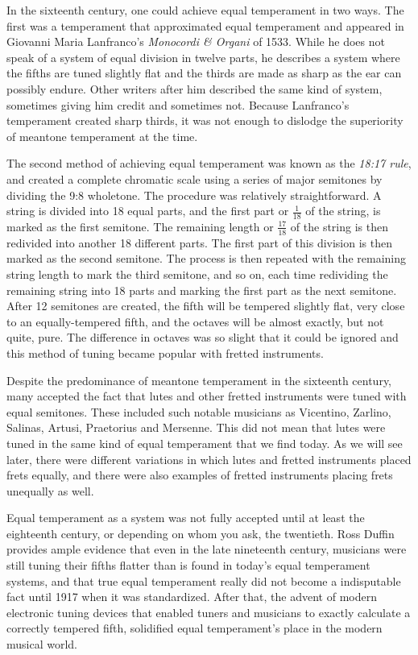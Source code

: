 In the sixteenth century, one could achieve equal temperament in two ways.  The first
was a temperament that approximated equal temperament and
appeared in Giovanni Maria Lanfranco's \textit{Monocordi \& Organi} of 1533.
While he does not speak of a system of equal division in twelve parts, he
describes a system where the fifths are tuned slightly flat and the thirds
are made as sharp as the ear can possibly endure. \autocite[45]{MB:1}
Other writers after him described the same kind of system, sometimes
giving him credit and sometimes not.  Because Lanfranco's temperament created sharp thirds,
it was not enough to dislodge the superiority of meantone temperament at the time.

The second method of achieving equal temperament was known as the \textit{18:17 rule}, and created
a complete chromatic scale using a series of major semitones by dividing the 9:8 wholetone.  The
procedure was relatively straightforward.  A string is divided into 18 equal parts, and the
first part or $ \frac{1}{18} $ of the string, is marked as
the first semitone.  The remaining length or $ \frac{17}{18} $ of the string is then redivided
into another 18 different parts.  The first part of this division is then marked as the
second semitone.  The process is then repeated with the remaining string length to mark the third
semitone, and so on, each time redividing the remaining string into 18 parts and marking the first
part as the next semitone.  After 12 semitones are created, the fifth will be tempered
slightly flat, very close to an equally-tempered fifth, and the octaves will be almost exactly,
but not quite, pure.  The difference in octaves was so slight that it could be ignored and this
method of tuning became popular with fretted instruments.

Despite the predominance of meantone temperament in the sixteenth
century, many accepted the
fact that lutes and other fretted instruments were tuned with
equal semitones.  These included such notable musicians as
Vicentino, Zarlino, Salinas, Artusi, Praetorius and Mersenne. \autocite[19]{ML:1}
This did not mean that lutes were tuned in the same kind of equal temperament that we
find today.
As we will see later, there were different variations in which
lutes and fretted instruments placed frets equally, and there
were also examples of fretted instruments placing frets
unequally as well.

Equal temperament as a system was not fully accepted until at
least the eighteenth century, or depending on whom you
ask, the twentieth.  Ross Duffin provides ample
evidence that even in the late nineteenth century,
musicians were still tuning their fifths flatter than is found
in today's equal temperament systems, and that true equal
temperament really did not become a indisputable fact until 1917
when it was standardized. \autocite[138]{RD:1}  After that, the
advent of modern electronic tuning devices that enabled tuners
and musicians to exactly calculate
a correctly tempered fifth,
solidified equal temperament's place in the modern musical world.

